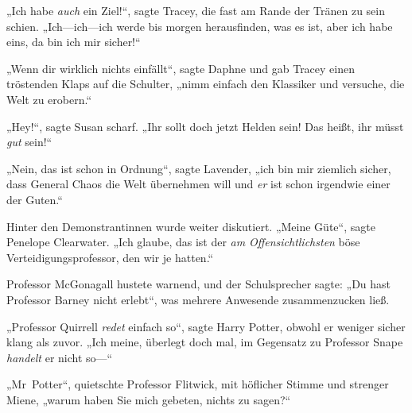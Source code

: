 „Ich habe \emph{auch} ein Ziel!“, sagte Tracey, die fast am Rande der Tränen zu sein schien. „Ich—ich—ich werde bis morgen herausfinden, was es ist, aber ich habe eins, da bin ich mir sicher!“

„Wenn dir wirklich nichts einfällt“, sagte Daphne und gab Tracey einen tröstenden Klaps auf die Schulter, „nimm einfach den Klassiker und versuche, die Welt zu erobern.“

„Hey!“, sagte Susan scharf. „Ihr sollt doch jetzt Helden sein! Das heißt, ihr müsst \emph{gut} sein!“

„Nein, das ist schon in Ordnung“, sagte Lavender, „ich bin mir ziemlich sicher, dass General Chaos die Welt übernehmen will und \emph{er} ist schon irgendwie einer der Guten.“

Hinter den Demonstrantinnen wurde weiter diskutiert. „Meine Güte“, sagte Penelope Clearwater. „Ich glaube, das ist der \emph{am} \emph{Offensichtlichsten} böse Verteidigungsprofessor, den wir je hatten.“

Professor McGonagall hustete warnend, und der Schulsprecher sagte: „Du hast Professor Barney nicht erlebt“, was mehrere Anwesende zusammenzucken ließ.

„Professor Quirrell \emph{redet} einfach so“, sagte Harry Potter, obwohl er weniger sicher klang als zuvor. „Ich meine, überlegt doch mal, im Gegensatz zu Professor Snape \emph{handelt} er nicht so—“

„Mr~Potter“, quietschte Professor Flitwick, mit höflicher Stimme und strenger Miene, „warum haben Sie mich gebeten, nichts zu sagen?“

